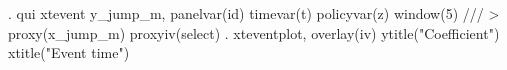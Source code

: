 . qui xtevent y_jump_m, panelvar(id) timevar(t) policyvar(z) window(5) ///
>         proxy(x_jump_m) proxyiv(select)
{\smallskip}
. xteventplot, overlay(iv) ytitle("Coefficient") xtitle("Event time")

